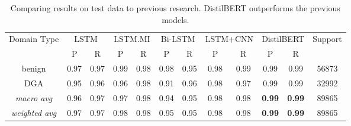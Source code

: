\begin{table*}[!htb]
    \centering{}%
    \begin{tabular}{cccccccccccc}
        \toprule
        \multirow{2}{*}{Domain Type} & \multicolumn{2}{c}{LSTM} & \multicolumn{2}{c}{LSTM.MI} & \multicolumn{2}{c}{Bi-LSTM} & \multicolumn{2}{c}{LSTM+CNN} & \multicolumn{2}{c}{DistilBERT} & Support\tabularnewline
        \cmidrule{2-12} \cmidrule{3-12} \cmidrule{4-12} \cmidrule{5-12} \cmidrule{6-12} \cmidrule{7-12} \cmidrule{8-12} \cmidrule{9-12} \cmidrule{10-12} \cmidrule{11-12} \cmidrule{12-12}
                                     & P                        & \multicolumn{1}{c}{R}       & P                           & R                            & P                              & \multicolumn{1}{c}{R}  & P    & R    & P             & R             & \tabularnewline
        \midrule
        benign                       & 0.97                     & 0.97                        & \multicolumn{1}{c}{0.99}    & 0.98                         & 0.98                           & 0.95                   & 0.98 & 0.99 & 0.99          & 0.99          & 56873\tabularnewline
        \midrule
        DGA                          & 0.95                     & 0.96                        & 0.96                        & 0.98                         & 0.91                           & 0.96                   & 0.98 & 0.97 & 0.99          & 0.99          & 32992\tabularnewline
        \midrule
        \emph{macro avg}             & 0.96                     & 0.97                        & 0.97                        & 0.98                         & 0.94                           & 0.95                   & 0.98 & 0.98 & \textbf{0.99} & \textbf{0.99} & 89865\tabularnewline
        \midrule
        \emph{weighted avg}          & 0.97                     & 0.97                        & 0.98                        & 0.98                         & 0.95                           & 0.95                   & 0.98 & 0.98 & \textbf{0.99} & \textbf{0.99} & 89865\tabularnewline
        \bottomrule
    \end{tabular}
    \caption{\label{comparison_results}Comparing results on test data to previous research. DistilBERT outperforms the previous models.}
\end{table*}
